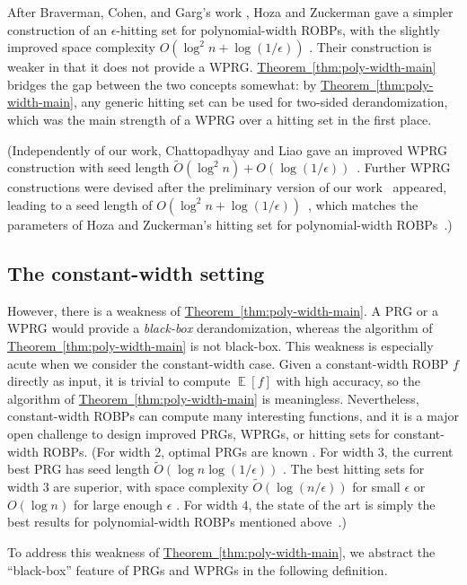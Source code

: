 \documentclass[11pt]{article}
\numberwithin{equation}{section}
\theoremstyle{definition}
\theoremstyle{plain}
\newcommand{\expref}[2]{\hyperref[#2]{#1~\ref{#2}}}
\DeclareMathOperator*{\ExpVal}{\mathbb{E}}
\begin{document}
After Braverman, Cohen, and Garg's work \cite{BCG20}, Hoza and Zuckerman gave a simpler construction of an $\epsilon$-hitting set for polynomial-width ROBPs, with the slightly improved space complexity $O(\log^2 n + \log(1/\epsilon))$ \cite{HZ20}. Their construction is weaker in that it does not provide a WPRG. \expref{Theorem}{thm:poly-width-main} bridges the gap between the two concepts somewhat: by \expref{Theorem}{thm:poly-width-main}, any generic hitting set can be used for two-sided derandomization, which was the main strength of a WPRG over a hitting set in the first place.

(Independently of our work, Chattopadhyay and Liao gave an improved WPRG construction with seed length $\widetilde{O}(\log^2 n) + O(\log(1/\epsilon))$~\cite{CL20}. Further WPRG constructions were devised after the preliminary version of our work~\cite{conf-version} appeared, leading to a seed length of $O(\log^2 n + \log(1/\epsilon))$~\cite{CDRSTS21,PV21,Hoz21}, which matches the parameters of Hoza and Zuckerman's hitting set for polynomial-width ROBPs~\cite{HZ20}.)

\subsection{The constant-width setting}

However, there is a weakness of \expref{Theorem}{thm:poly-width-main}. A PRG or a WPRG would provide a \emph{black-box} derandomization, whereas the algorithm of \expref{Theorem}{thm:poly-width-main} is not black-box. This weakness is especially acute when we consider the constant-width case. Given a constant-width ROBP $f$ directly as input, it is trivial to compute $\ExpVal[f]$ with high accuracy, so the algorithm of \expref{Theorem}{thm:poly-width-main} is meaningless. Nevertheless, constant-width ROBPs can compute many interesting functions, and it is a major open challenge to design improved PRGs, WPRGs, or hitting sets for constant-width ROBPs. (For width $2$, optimal PRGs are known \cite{BDVY13}. For width $3$, the current best PRG has seed length $\widetilde{O}(\log n \log(1/\epsilon))$ \cite{MRT19}. The best hitting sets for width $3$ are superior, with space complexity $\widetilde{O}(\log(n/\epsilon))$ for small $\epsilon$ \cite{GMRTV12} or $O(\log n)$ for large enough $\epsilon$ \cite{SZ21}. For width $4$, the state of the art is simply the best results for polynomial-width ROBPs mentioned above~\cite{Nis92,HZ20,Hoz21}.)

To address this weakness of \expref{Theorem}{thm:poly-width-main}, we abstract the ``black-box'' feature of PRGs and WPRGs in the following definition.
\end{document}
